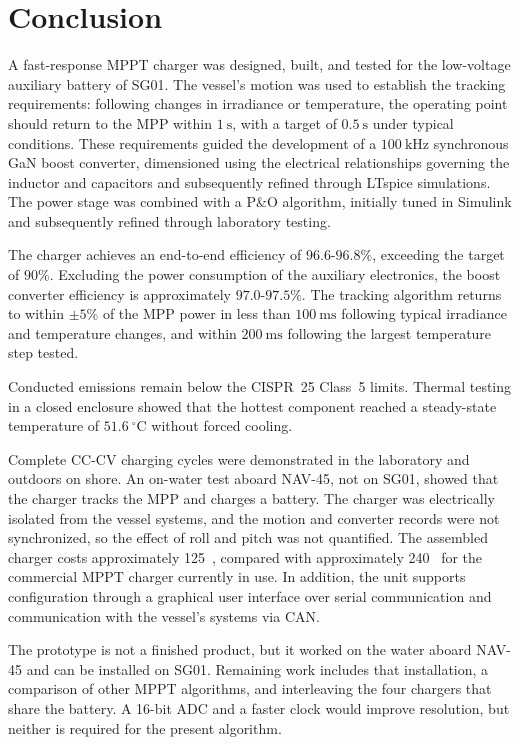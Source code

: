 \documentclass[conference]{IEEEtran}
\begin{document}
\section{Conclusion}

    A fast-response MPPT charger was designed, built, and tested for the low-voltage auxiliary battery of SG01. The vessel's motion was used to establish the tracking requirements: following changes in irradiance or temperature, the operating point should return to the MPP within $1~\mathrm{s}$, with a target of $0.5~\mathrm{s}$ under typical conditions. These requirements guided the development of a $100~\mathrm{kHz}$ synchronous GaN boost converter, dimensioned using the electrical relationships governing the inductor and capacitors and subsequently refined through LTspice simulations. The power stage was combined with a P\&O algorithm, initially tuned in Simulink and subsequently refined through laboratory testing.

    The charger achieves an end-to-end efficiency of $96.6$-$96.8\%$, exceeding the target of $90\%$. Excluding the power consumption of the auxiliary electronics, the boost converter efficiency is approximately $97.0$-$97.5\%$. The tracking algorithm returns to within $\pm 5\%$ of the MPP power in less than $100~\mathrm{ms}$ following typical irradiance and temperature changes, and within $200~\mathrm{ms}$ following the largest temperature step tested. 

    Conducted emissions remain below the CISPR~25 Class~5 limits. Thermal testing in a closed enclosure showed that the hottest component reached a steady-state temperature of $51.6~^\circ\mathrm{C}$ without forced cooling.
    
    Complete CC-CV charging cycles were demonstrated in the laboratory and outdoors on shore. An on-water test aboard NAV-45, not on SG01, showed that the charger tracks the MPP and charges a battery. The charger was electrically isolated from the vessel systems, and the motion and converter records were not synchronized, so the effect of roll and pitch was not quantified. The assembled charger costs approximately 125~\texteuro{}, compared with approximately 240~\texteuro{} for the commercial MPPT charger currently in use. In addition, the unit supports configuration through a graphical user interface over serial communication and communication with the vessel's systems via CAN.

    The prototype is not a finished product, but it worked on the water aboard NAV-45 and can be installed on SG01. Remaining work includes that installation, a comparison of other MPPT algorithms, and interleaving the four chargers that share the battery. A 16-bit ADC and a faster clock would improve resolution, but neither is required for the present algorithm.




\end{document}
